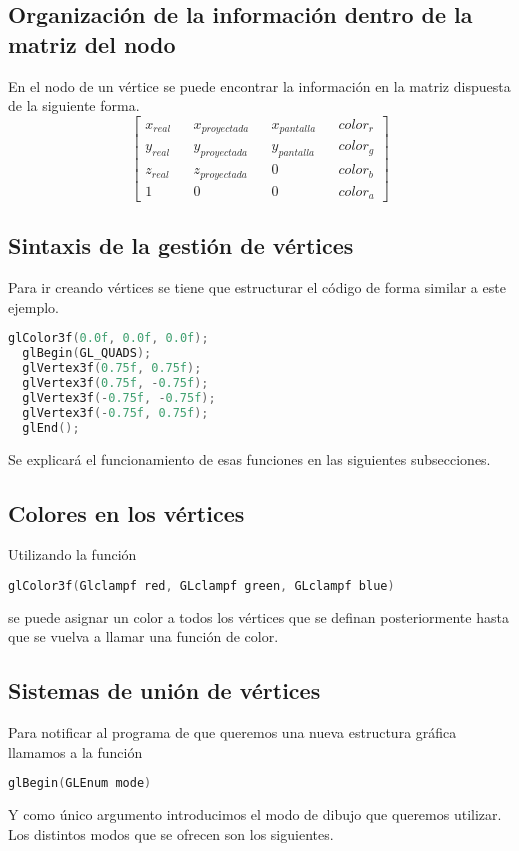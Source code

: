 \documentclass{report}
\begin{document}
\subsection{Organización de la información dentro de la matriz del nodo}
En el nodo de un vértice se puede encontrar la información en la matriz dispuesta de la siguiente forma.
\begin{equation}
  \begin{bmatrix}
    x_{real} && x_{proyectada} && x_{pantalla} && color_r \\
    y_{real} && y_{proyectada} && y_{pantalla} && color_g \\
    z_{real} && z_{proyectada} && 0 && color_b \\
    1 && 0 && 0 && color_a
  \end{bmatrix}
\end{equation}
\subsection{Sintaxis de la gestión de vértices}
Para ir creando vértices se tiene que estructurar el código de forma similar a este ejemplo.
\begin{lstlisting}[language=C]
  glColor3f(0.0f, 0.0f, 0.0f);
  glBegin(GL_QUADS);
  glVertex3f(0.75f, 0.75f);
  glVertex3f(0.75f, -0.75f);
  glVertex3f(-0.75f, -0.75f);
  glVertex3f(-0.75f, 0.75f);
  glEnd();
\end{lstlisting}
Se explicará el funcionamiento de esas funciones en las siguientes subsecciones.
\subsection{Colores en los vértices}
Utilizando la función
\begin{lstlisting}[language=C]
  glColor3f(Glclampf red, GLclampf green, GLclampf blue)
\end{lstlisting}
se puede asignar un color a todos los vértices que se definan posteriormente hasta que se vuelva a llamar una función de color.
\subsection{Sistemas de unión de vértices}
Para notificar al programa de que queremos una nueva estructura gráfica llamamos a la función
\begin{lstlisting}[language=C]
  glBegin(GLEnum mode)
\end{lstlisting}
Y como único argumento introducimos el modo de dibujo que queremos utilizar. Los distintos modos que se ofrecen son los siguientes.
\end{document}
